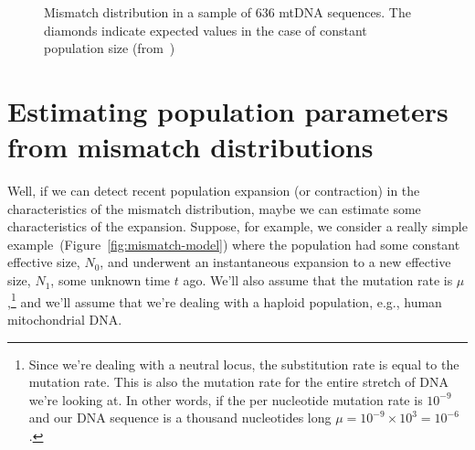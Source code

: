 \begin{figure}
\begin{center}
\end{center}
\caption{Mismatch distribution in a sample of 636 mtDNA sequences. The
  diamonds indicate expected values in the case of constant population 
  size (from~\cite{Harpending-etal-1998})}\label{fig:mismatch-humans} 
\end{figure}

\section*{Estimating population parameters from mismatch distributions}

Well, if we can detect recent population expansion (or contraction) in
the characteristics of the mismatch distribution, maybe we can
estimate some characteristics of the expansion. Suppose, for example,
we consider a really simple example~(Figure~\ref{fig:mismatch-model})
where the population had some constant effective size, $N_0$, and
underwent an instantaneous expansion to a new effective size, $N_1$,
some unknown time $t$ ago. We'll also assume that the mutation rate is
$\mu$,\footnote{Since we're dealing with a neutral locus, the
  substitution rate is equal to the mutation rate. This is also the
  mutation rate for the entire stretch of DNA we're looking at. In
  other words, if the per nucleotide mutation rate is $10^{-9}$ and
  our DNA sequence is a thousand nucleotides long $\mu = 10^{-9}\times
  10^3 = 10^{-6}$.} and we'll assume that we're dealing with a haploid
population, e.g., human mitochondrial DNA.

